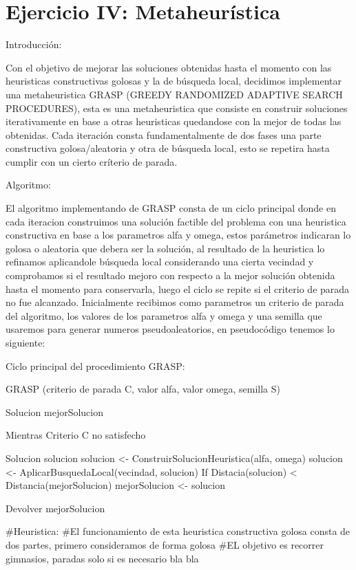 \section{Ejercicio IV: Metaheur\'istica}

Introducción:

Con el objetivo de mejorar las soluciones obtenidas hasta el momento con las heuristicas constructivas golosas y la de búsqueda local, decidimos implementar una metaheuristica GRASP (GREEDY RANDOMIZED ADAPTIVE SEARCH PROCEDURES), esta es una metaheuristica que consiste en construir soluciones iterativamente en base a otras heuristicas quedandose con la mejor de todas las obtenidas. Cada iteración consta fundamentalmente de dos fases una parte constructiva golosa/aleatoria y otra de búsqueda local, esto se repetira hasta cumplir con un cierto críterio de parada.

Algoritmo:

El algoritmo implementando de GRASP consta de un ciclo principal donde en cada iteracion construimos una solución factible del problema con una heuristica constructiva en base a los parametros alfa y omega, estos parámetros indicaran lo golosa o aleatoria que debera ser la solución, al resultado de la heuristica lo refinamos aplicandole búsqueda local considerando una cierta vecindad y comprobamos si el resultado mejoro con respecto a la mejor solución obtenida hasta el momento para conservarla, luego el ciclo se repite si el criterio de parada no fue alcanzado. Inicialmente recibimos como parametros un criterio de parada del algoritmo, los valores de los parametros alfa y omega y una semilla que usaremos para generar numeros pseudoaleatorios, en pseudocódigo tenemos lo siguiente:

Ciclo principal del procedimiento GRASP:

	GRASP (criterio de parada C, valor alfa, valor omega, semilla S)

	Solucion mejorSolucion

	Mientras Criterio C no satisfecho

		Solucion solucion
		solucion <- ConstruirSolucionHeuristica(alfa, omega)
		solucion <- AplicarBusquedaLocal(vecindad, solucion)
		If Distacia(solucion) < Distancia(mejorSolucion)
			mejorSolucion <- solucion

	Devolver mejorSolucion


#Heuristica:
#El funcionamiento de esta heuristica constructiva golosa consta de dos partes, primero consideramos de forma golosa 
#EL objetivo es recorrer gimnasios, paradas solo si es necesario bla bla 

